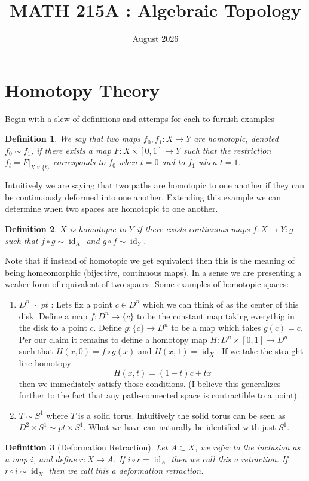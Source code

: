 \documentclass[40pt]{article}
\title{MATH 215A : Algebraic Topology}
\date{August 2026}
\newtheorem{definition}{Definition}[section]
\DeclareMathOperator{\id}{\text{id}}
\begin{document}
	\maketitle
	\section{Homotopy Theory}
	Begin with a slew of definitions and attemps for each to furnish examples
	\begin{definition}
		We say that two maps $f_0, f_1 : X \rightarrow Y$ are homotopic, denoted $f_0 \sim f_1$, if there exists a map $F: X \times [0,1] \rightarrow Y$ such that the restriction $f_t = F|_{X \times \{t\}}$ corresponds to $f_0$ when $t = 0$ and to $f_1$ when $t = 1$. 
	\end{definition}
	Intuitively we are saying that two paths are homotopic to one another if they can be continuously deformed into one another. Extending this example we can determine when two spaces are homotopic to one another. 
	\begin{definition}
		$X$ is homotopic to $Y$ if there exists continuous maps $f: X \rightarrow Y : g$ such that $f \circ g \sim \id_X$ and $g \circ f \sim \id_Y$. 
	\end{definition}
	Note that if instead of homotopic we get equivalent then this is the meaning of being homeomorphic (bijective, continuous maps). In a sense we are presenting a weaker form of equivalent of two spaces. Some examples of homotopic spaces:
	\begin{enumerate}
		\item $D^n \sim pt$ : Lets fix a point $c \in D^n$ which we can think of as the center of this disk. Define a map $f : D^n \rightarrow \{c\}$ to be the constant map taking everythig in the disk to a point $c$. Define $g: \{c\} \rightarrow D^n$ to be a map which takes $g(c) = c$. Per our claim it remains to define a homotopy map $H: D^n \times [0,1] \rightarrow D^n$ such that $H(x,0) = f \circ g (x)$ and $H(x,1) = \id_X$. If we take the straight line homotopy
		\[
		H(x,t) = (1-t)c + tx
		\]
		then we immediately satisfy those conditions. (I believe this generalizes further to the fact that any path-connected space is contractible to a point). 
		\item $T \sim S^1$ where $T$ is a solid torus. Intuitively the solid torus can be seen as $D^2 \times S^1\sim pt \times S^1$. What we have can naturally be identified with just $S^1$. 
	\end{enumerate}
	\begin{definition}[Deformation Retraction]
		Let $A \subset X$, we refer to the inclusion as a map $i$, and define $r : X \rightarrow A$. If $i \circ r = \id_A$ then we call this a retraction. If $r \circ i \sim \id_X$ then we call this a deformation retraction. 
	\end{definition}
\end{document}
